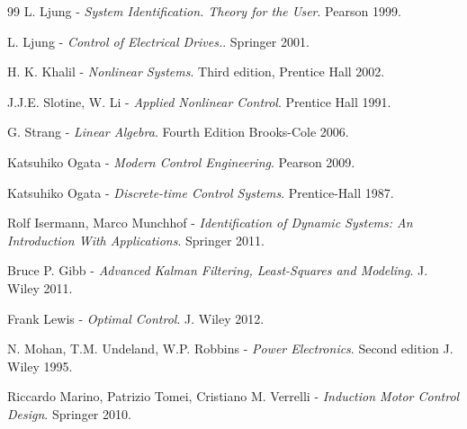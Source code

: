 \documentclass[11pt,a4paper,oneside]{book}
\begin{document}
\begin{onehalfspace}
\begin{thebibliography}{99}
	 L. Ljung - \textit{System Identification. Theory for the User}. Pearson 1999.

	 L. Ljung - \textit{Control of Electrical Drives.}. Springer 2001.

	 H. K. Khalil - \textit{Nonlinear Systems}. Third edition, Prentice Hall 2002.
	
	 J.J.E. Slotine, W. Li - \textit{Applied Nonlinear Control}. Prentice Hall 1991.
	
	 G. Strang - \textit{Linear Algebra}. Fourth Edition Brooks-Cole 2006.
	
	 Katsuhiko Ogata - \textit{Modern 
	Control Engineering}. Pearson 2009.	

	 Katsuhiko Ogata - \textit{Discrete-time Control Systems}. Prentice-Hall 1987.
	
	 Rolf Isermann, Marco Munchhof - \textit{Identification of Dynamic Systems: An Introduction With 
		Applications}. Springer 2011.
	
	 Bruce P. Gibb - \textit{Advanced Kalman Filtering, Least-Squares and Modeling}. J. Wiley 2011.
	
	 Frank Lewis - \textit{Optimal Control}. J. Wiley 2012.
	
	 N. Mohan, T.M. Undeland, W.P. Robbins - \textit{Power Electronics}. Second edition J. Wiley 1995.

	 Riccardo Marino, Patrizio Tomei, Cristiano M. Verrelli - \textit{Induction Motor Control Design}. Springer 2010.

\end{thebibliography}
\end{onehalfspace}
\end{document}
